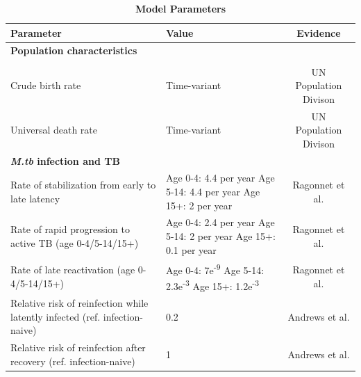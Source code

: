 \documentclass{article}
\begin{document}
\begin{table}[!htp]
    \caption{\textbf{Model Parameters}}
    \label{tab:parameter}
    \begin{tabularx}{\textwidth}{ X  X  c }
        \hline
        \textbf{Parameter} & \textbf{Value} & \textbf{Evidence} \\
        \hline
        \textbf{Population characteristics} & & \\
         \\
        Crude birth rate  & Time-variant & UN Population Divison \\
        Universal death rate & Time-variant & UN Population Divison \\
        \hline
        \textbf{\emph{M.tb} infection and TB} \\
        Rate of stabilization from early to late latency &    
        \begin{minipage}[t]{0.3\textwidth}
            Age 0-4: 4.4 per year \newline
            Age 5-14: 4.4 per year \newline
            Age 15+: 2 per year \newline
        \end{minipage}
        & Ragonnet et al.\cite{ragonnet-2017} \\
        Rate of rapid progression to active TB (age 0-4/5-14/15+) & 
        \begin{minipage}[t]{0.3\textwidth}
            Age 0-4: 2.4 per year \newline
            Age 5-14: 2 per year \newline
            Age 15+: 0.1 per year \newline
        \end{minipage}
        & Ragonnet et al.\cite{ragonnet-2017} \\
        Rate of late reactivation (age 0-4/5-14/15+) & 
        \begin{minipage}[t]{0.3\textwidth}
            Age 0-4: 7e\textsuperscript{-9} \newline
            Age 5-14: 2.3e\textsuperscript{-3} \newline
            Age 15+: 1.2e\textsuperscript{-3} \newline
        \end{minipage}
        & Ragonnet et al.\cite{ragonnet-2017} \\
        Relative risk of reinfection while latently infected (ref. infection-naive) & 0.2 & Andrews et al.\cite{andrews-2012} \\
        Relative risk of reinfection after recovery (ref. infection-naive) & 1 & Andrews et al.\cite{andrews-2012} \\
        \hline
	\end{tabularx}
\end{table}
\end{document}
